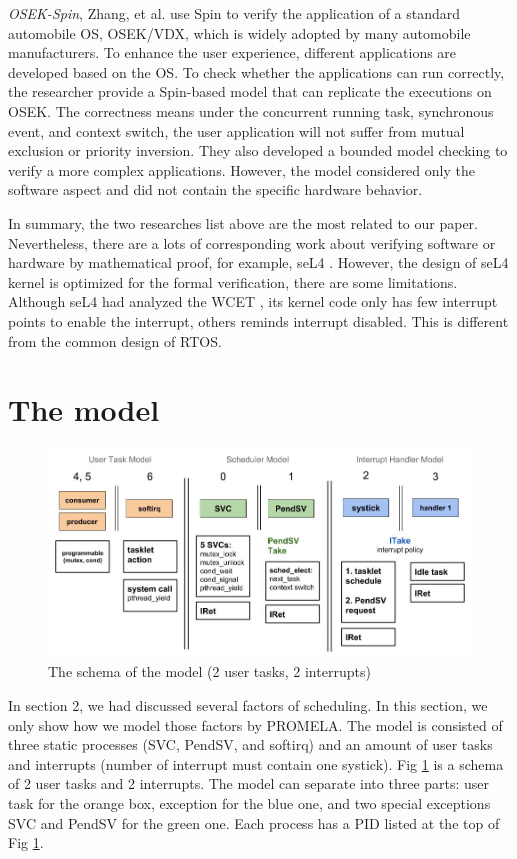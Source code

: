 \textit{OSEK-Spin}, Zhang, et al. \cite{10.1007/978-3-319-17581-2_16} use Spin to verify the application of a standard automobile OS, OSEK/VDX, which is widely adopted by many automobile manufacturers. To enhance the user experience, different applications are developed based on the OS. To check whether the applications can run correctly, the researcher provide a Spin-based model that can replicate the executions on OSEK. The correctness means under the concurrent running task, synchronous event, and context switch, the user application will not suffer from mutual exclusion or priority inversion. They also developed a bounded model checking to verify a more complex applications. However, the model considered only the software aspect and did not contain the specific hardware behavior.

In summary, the two researches list above are the most related to our paper. Nevertheless, there are a lots of corresponding work about verifying software or hardware by mathematical proof, for example, seL4 \cite{Klein:2009:SFV:1629575.1629596}. However, the design of seL4 kernel is optimized for the formal verification, there are some limitations. Although seL4 had analyzed the WCET \cite{6121451}, its kernel code only has few interrupt points to enable the interrupt, others reminds interrupt disabled. This is different from the common design of RTOS.

\section{The model}

\begin{figure}
\includegraphics[width=0.7\linewidth]{model}
\caption{The schema of the model (2 user tasks, 2 interrupts)}
\label{fig:model}
\end{figure}

In section 2, we had discussed several factors of scheduling. In this section, we only show how we model those factors by PROMELA. The model is consisted of three static processes (SVC, PendSV, and softirq) and an amount of user tasks and interrupts (number of interrupt must contain one systick). Fig \ref{fig:model} is a schema of 2 user tasks and 2 interrupts. The model can separate into three parts: user task for the orange box, exception for the blue one, and two special exceptions SVC and PendSV for the green one. Each process has a PID listed at the top of Fig \ref{fig:model}.

